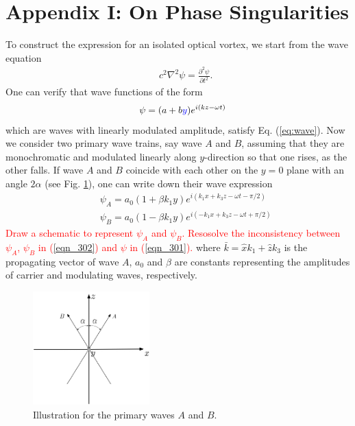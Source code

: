\section*{Appendix I: On Phase Singularities}

To construct the expression for an isolated optical vortex, we start from the wave equation
\begin{eqnarray}
	&&c^2\nabla^2\psi = \frac{\partial^2 \psi}{\partial t^2}.
	\label{eq:wave}
\end{eqnarray}
One can verify that wave functions of the form
\begin{eqnarray}
	&&\psi = (a + b\textcolor{blue}{y}) e^{i(kz - \omega t)}
	\label{eqn_301}
\end{eqnarray}
which are waves with linearly modulated amplitude, satisfy Eq. (\ref{eq:wave}). 
Now we consider two primary wave trains, say wave $A$ and $B$, assuming that they are monochromatic and modulated linearly along $y$-direction so that one rises, as the other falls. 
If wave $A$ and $B$ coincide with each other on the $y = 0$ plane with an angle $2 \alpha$ (see Fig. \ref{fig:two_primary_waves}), one can write down their wave expression
\begin{eqnarray}
	&&\psi_A = a_0(1 + \beta k_1 y) e^{i(k_1 x + k_3 z - \omega t - \pi/2)}
	\nonumber \\
	&&\psi_B = a_0(1 - \beta k_1 y) e^{i(-k_1 x + k_3 z - \omega t + \pi/2)}
	\label{eqn_302}
\end{eqnarray}
\textcolor{red}{Draw a schematic to represent $\psi_A$ and $\psi_B$.
	Resosolve the inconsistency between $\psi_A$, $\psi_B$ in (\ref{eqn_302}) and $\psi$ in (\ref{eqn_301}).}
where $\bar{k} = \hat{x} k_1 + \hat{z} k_3$ is the propagating vector of wave $A$, 
$a_0$ and $\beta$ are constants representing the amplitudes of carrier and modulating waves, respectively.

\begin{figure}[h]
	\centering
	\includegraphics[width = 0.4\textwidth]{primary_waves.jpg}
	\caption{Illustration for the primary waves $A$ and $B$.}
	\label{fig:two_primary_waves}
\end{figure}

